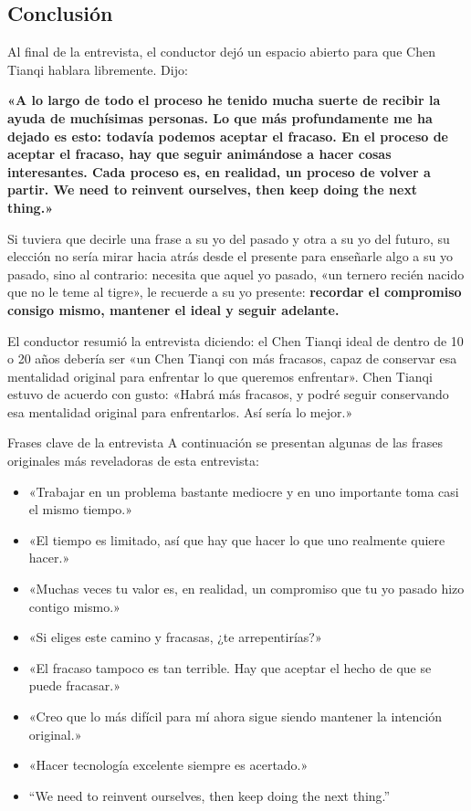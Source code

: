\subsection{Conclusión}

Al final de la entrevista, el conductor dejó un espacio abierto para que Chen Tianqi hablara libremente. Dijo:

\textbf{«A lo largo de todo el proceso he tenido mucha suerte de recibir la ayuda de muchísimas personas. Lo que más profundamente me ha dejado es esto: todavía podemos aceptar el fracaso. En el proceso de aceptar el fracaso, hay que seguir animándose a hacer cosas interesantes. Cada proceso es, en realidad, un proceso de volver a partir. We need to reinvent ourselves, then keep doing the next thing.»}

Si tuviera que decirle una frase a su yo del pasado y otra a su yo del futuro, su elección no sería mirar hacia atrás desde el presente para enseñarle algo a su yo pasado, sino al contrario: necesita que aquel yo pasado, «un ternero recién nacido que no le teme al tigre», le recuerde a su yo presente: \textbf{recordar el compromiso consigo mismo, mantener el ideal y seguir adelante.}

El conductor resumió la entrevista diciendo: el Chen Tianqi ideal de dentro de 10 o 20 años debería ser «un Chen Tianqi con más fracasos, capaz de conservar esa mentalidad original para enfrentar lo que queremos enfrentar». Chen Tianqi estuvo de acuerdo con gusto: «Habrá más fracasos, y podré seguir conservando esa mentalidad original para enfrentarlos. Así sería lo mejor.»

\begin{importantbox}{Frases clave de la entrevista}
A continuación se presentan algunas de las frases originales más reveladoras de esta entrevista:
\begin{itemize}
    \item «Trabajar en un problema bastante mediocre y en uno importante toma casi el mismo tiempo.»
    \item «El tiempo es limitado, así que hay que hacer lo que uno realmente quiere hacer.»
    \item «Muchas veces tu valor es, en realidad, un compromiso que tu yo pasado hizo contigo mismo.»
    \item «Si eliges este camino y fracasas, ¿te arrepentirías?»
    \item «El fracaso tampoco es tan terrible. Hay que aceptar el hecho de que se puede fracasar.»
    \item «Creo que lo más difícil para mí ahora sigue siendo mantener la intención original.»
    \item «Hacer tecnología excelente siempre es acertado.»
    \item ``We need to reinvent ourselves, then keep doing the next thing.''
\end{itemize}
\end{importantbox}

